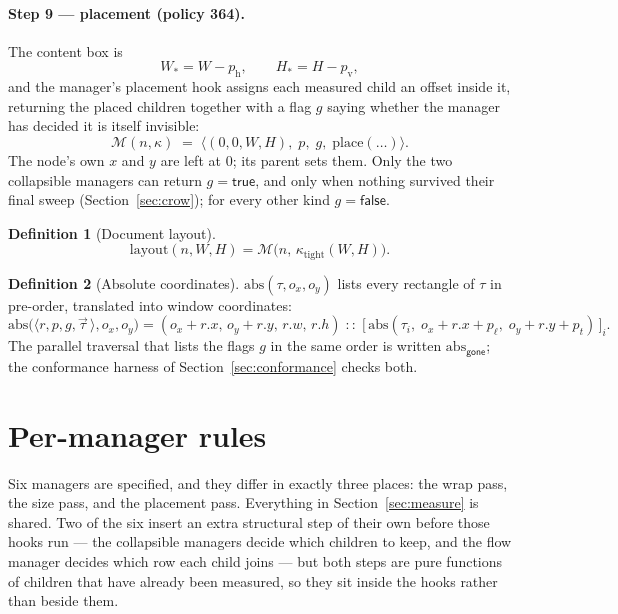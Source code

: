 \documentclass[11pt,a4paper]{article}
\newcommand{\gone}{\mathsf{gone}}
\newcommand{\Mm}{\mathcal{M}}          %
\theoremstyle{definition}
\newtheorem{definition}{Definition}[section]
\theoremstyle{plain}
\theoremstyle{remark}
\begin{document}
\paragraph{Step 9 --- placement (policy 364).}
The content box is
\[
  W_{\!*} = W - p_{\mathrm{h}}, \qquad H_{\!*} = H - p_{\mathrm{v}},
\]
and the manager's placement hook assigns each measured child an offset inside
it, returning the placed children together with a flag $g$ saying whether the
manager has decided it is itself invisible:
\[
  \Mm(n,\kappa) \;=\; \bigl\langle (0, 0, W, H),\; p,\; g,\; \mathrm{place}(\ldots) \bigr\rangle .
\]
The node's own $x$ and $y$ are left at $0$; its parent sets them. Only the two
collapsible managers can return $g = \textsf{true}$, and only when nothing
survived their final sweep (Section~\ref{sec:crow}); for every other kind
$g = \textsf{false}$.

\begin{definition}[Document layout]
\[
  \mathrm{layout}(n, W, H) = \Mm\bigl(n,\, \kappa_{\mathrm{tight}}(W, H)\bigr).
\]
\end{definition}

\begin{definition}[Absolute coordinates]
$\mathrm{abs}(\tau, o_x, o_y)$ lists every rectangle of $\tau$ in pre-order,
translated into window coordinates:
\[
  \mathrm{abs}\bigl(\langle r, p, g, \vec\tau\,\rangle, o_x, o_y\bigr)
    = (o_x + r.x,\, o_y + r.y,\, r.w,\, r.h) \;::\;
      \bigl[\,\mathrm{abs}(\tau_i,\; o_x + r.x + p_\ell,\; o_y + r.y + p_t)\,\bigr]_i .
\]
The parallel traversal that lists the flags $g$ in the same order is written
$\mathrm{abs}_{\gone}$; the conformance harness of
Section~\ref{sec:conformance} checks both.
\end{definition}

\section{Per-manager rules}

Six managers are specified, and they differ in exactly three places: the wrap
pass, the size pass, and the placement pass. Everything in
Section~\ref{sec:measure} is shared. Two of the six insert an extra structural
step of their own before those hooks run --- the collapsible managers decide
which children to keep, and the flow manager decides which row each child joins
--- but both steps are pure functions of children that have already been
measured, so they sit inside the hooks rather than beside them.
\end{document}
